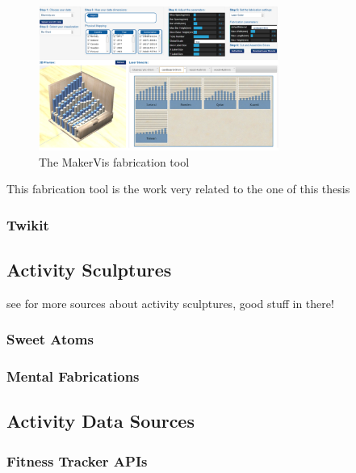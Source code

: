 \documentclass[../medieninformatik-arbeit.tex]{subfiles}
\begin{document}
\begin{figure}[h]
\begin{center}
  \includegraphics[width=0.7\textwidth]{RelatedWork/img/MakerVis}
  \caption{The MakerVis fabrication tool\cite{swaminathan2014supporting} }
\label{fig:makervis-config}
\end{center}
\end{figure}

This fabrication tool is the work very related to the one of this thesis

\subsubsection{Twikit}

\subsection{Activity Sculptures}
see \cite{swaminathan2014supporting} for more sources about activity sculptures, good stuff in there!

\subsubsection{Sweet Atoms}

\subsubsection{Mental Fabrications}

\subsection{Activity Data Sources}

\subsubsection{Fitness Tracker APIs}
\end{document}
